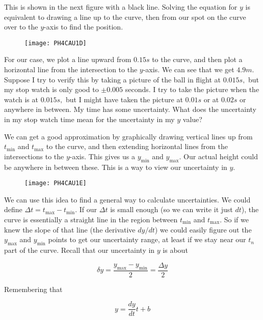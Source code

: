 This is shown in the next figure with a black line. Solving the equation for $y$ is equivalent to drawing a line up to the curve, then from our spot on the curve over to the $y$-axis to find the position.

\begin{figure}[h!]
	\centering
    \texttt{[image: PH4CAU1D]}
\end{figure}

For our case, we plot a line upward from $0.15\unit{s}$ to the curve, and then plot a horizontal line from the intersection to the $y$-axis. We can see that we get $4.9\unit{m}.$ Suppose I try to verify this by taking a picture of the ball in flight at $0.015\unit{s},$ but my stop watch is only
good to $\pm 0.005$ seconds. I try to take the picture when the watch is at $0.015\unit{s},$ but I might have taken the picture at $0.01\unit{s}$ or at $0.02\unit{s}$ or anywhere in between. My time has some uncertainty. What does the uncertainty in my stop watch time mean for the uncertainty in my $y$ value?

We can get a good approximation by graphically drawing vertical lines up from $t_{\min }$ and $t_{\max }$ to the curve, and then extending horizontal lines from the intersections to the $y$-axis. This gives us a $y_{\min }$ and $y_{\max }.$ Our actual height could be anywhere in between these. This is a way to view our uncertainty in $y.$

\begin{figure}[h!]
	\centering
    \texttt{[image: PH4CAU1E]}
\end{figure}

We can use this idea to find a general way to calculate uncertainties. We could define $\Delta t=t_{\max }-t_{\min }$. If our $\Delta t$ is small enough (so we can write it just $dt$), the curve is essentially a straight line in the region between $t_{\min }$ and $t_{\max }.$ So if we knew the
slope of that line (the derivative $dy/dt$) we could easily figure out the $y_{\max }$ and $y_{\min }$ points to get our uncertainty range, at least if we stay near our $t_{n}$ part of the curve. Recall that our uncertainty in $y$ is about

\begin{equation*}
	\delta y=\frac{y_{\max }-y_{\min }}{2}=\frac{\Delta y}{2}
\end{equation*}

Remembering that 

\begin{equation*}
	y=\frac{dy}{dt}t+b
\end{equation*}

